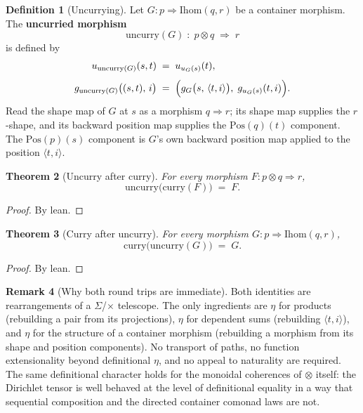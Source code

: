 \documentclass[11pt,a4paper]{article}
\theoremstyle{plain}
\newtheorem{theorem}{Theorem}[section]
\theoremstyle{definition}
\newtheorem{definition}[theorem]{Definition}
\newtheorem{remark}[theorem]{Remark}
\newcommand{\Pos}{\mathrm{Pos}}
\newcommand{\Ihom}{\mathrm{Ihom}}
\begin{document}
\begin{definition}[Uncurrying]\label{def:uncurry}
Let $G : p \Rightarrow \Ihom(q,r)$ be a container morphism. The
\textbf{uncurried morphism}
\begin{equation}
  \mathrm{uncurry}(G) \;:\; p \otimes q \;\Rightarrow\; r
\end{equation}
is defined by
\begin{align}
  u_{\mathrm{uncurry}(G)}(s,t)
  &\;=\;
  u_{u_G(s)}(t), \\[4pt]
  g_{\mathrm{uncurry}(G)}\bigl((s,t),\, i\bigr)
  &\;=\;
  \Bigl(
    g_G\bigl(s,\, \langle t, i \rangle\bigr),\;
    g_{u_G(s)}(t,i)
  \Bigr).
\end{align}
Read the shape map of $G$ at $s$ as a morphism $q \Rightarrow r$; its shape
map supplies the $r$-shape, and its backward position map supplies the
$\Pos(q)(t)$ component. The $\Pos(p)(s)$ component is $G$'s own backward
position map applied to the position $\langle t, i \rangle$.
\end{definition}

\begin{theorem}[Uncurry after curry]\label{thm:uncurry-curry}
For every morphism $F : p \otimes q \Rightarrow r$,
\begin{equation}
  \mathrm{uncurry}\bigl(\mathrm{curry}(F)\bigr) \;=\; F.
\end{equation}
\end{theorem}

\begin{proof}
By lean.
\end{proof}

\begin{theorem}[Curry after uncurry]\label{thm:curry-uncurry}
For every morphism $G : p \Rightarrow \Ihom(q,r)$,
\begin{equation}
  \mathrm{curry}\bigl(\mathrm{uncurry}(G)\bigr) \;=\; G.
\end{equation}
\end{theorem}

\begin{proof}
By lean.
\end{proof}

\begin{remark}[Why both round trips are immediate]
Both identities are rearrangements of a $\Sigma$/$\times$ telescope. The only
ingredients are $\eta$ for products (rebuilding a pair from its projections),
$\eta$ for dependent sums (rebuilding $\langle t, i \rangle$), and $\eta$
for the structure of a container morphism (rebuilding a morphism from its
shape and position components). No transport of paths, no function
extensionality beyond definitional $\eta$, and no appeal to naturality are
required. The same definitional character holds for the monoidal coherences
of $\otimes$ itself: the Dirichlet tensor is well behaved at the level of
definitional equality in a way that sequential composition and the directed
container comonad laws are not.
\end{remark}
\end{document}
